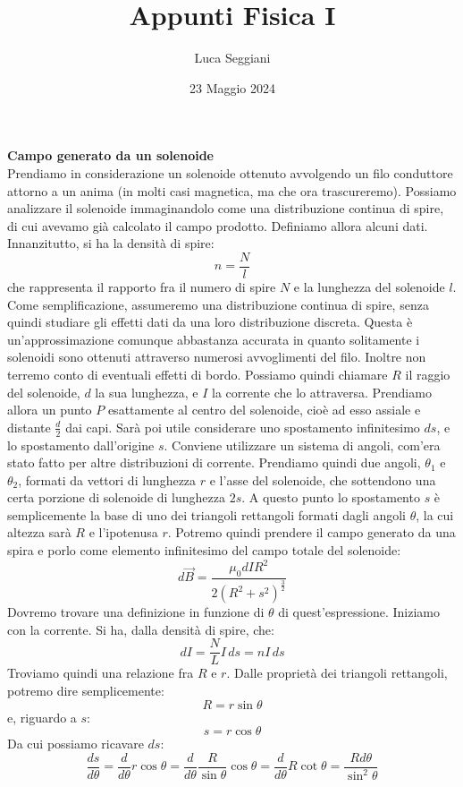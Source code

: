 \documentclass[a4paper,12pt]{article}
\title{Appunti Fisica I}
\author{Luca Seggiani}
\date{23 Maggio 2024}
\begin{document}
\maketitle
\textbf{Campo generato da un solenoide} \\
Prendiamo in considerazione un solenoide ottenuto avvolgendo un filo conduttore attorno a un anima (in molti casi magnetica, ma che ora trascureremo). Possiamo analizzare il solenoide immaginandolo come una distribuzione continua di spire,
di cui avevamo già calcolato il campo prodotto. Definiamo allora alcuni dati. Innanzitutto, si ha la densità di spire:
$$ n = \frac{N}{l} $$
che rappresenta il rapporto fra il numero di spire $N$ e la lunghezza del solenoide $l$. Come semplificazione, assumeremo una distribuzione continua di spire, senza quindi studiare gli effetti dati da una loro distribuzione discreta.
Questa è un'approssimazione comunque abbastanza accurata in quanto solitamente i solenoidi sono ottenuti attraverso numerosi avvoglimenti del filo. Inoltre non terremo conto di eventuali effetti di bordo.
Possiamo quindi chiamare $R$ il raggio del solenoide, $d$ la sua lunghezza, e $I$ la
corrente che lo attraversa. Prendiamo allora un punto $P$ esattamente al centro del solenoide, cioè ad esso assiale e distante $\frac{d}{2}$ dai capi. Sarà poi utile considerare uno spostamento infinitesimo $ds$, e lo spostamento dall'origine $s$.
Conviene utilizzare un sistema di angoli, com'era stato fatto per altre distribuzioni di corrente. Prendiamo quindi due angoli, $\theta_1$ e $\theta_2$, formati da vettori di lunghezza $r$ e l'asse del solenoide, che sottendono
una certa porzione di solenoide di lunghezza $2s$. A questo punto lo spostamento $s$ è semplicemente la base di uno dei triangoli rettangoli formati dagli angoli $\theta$, la cui altezza sarà $R$ e l'ipotenusa $r$. Potremo quindi prendere
il campo generato da una spira e porlo  come elemento infinitesimo del campo totale del solenoide:
$$ d\vec{B} = \frac{\mu_0 dI R^2}{2(R^2+s^2)^{\frac{3}{2}}} $$
Dovremo trovare una definizione in funzione di $\theta$ di quest'espressione. Iniziamo con la corrente. Si ha, dalla densità di spire, che:
$$ dI = \frac{N}{L}I\, ds= nI\,ds $$
Troviamo quindi una relazione fra $R$ e $r$. Dalle proprietà dei triangoli rettangoli, potremo dire semplicemente:
$$ R = r\sin{\theta} $$
e, riguardo a $s$:
$$ s = r\cos{\theta} $$
Da cui possiamo ricavare $ds$:
$$ \frac{ds}{d\theta} = \frac{d}{d\theta} r\cos{\theta} = \frac{d}{d\theta} \frac{R}{\sin{\theta}}{\cos{\theta} = \frac{d}{d\theta} R\cot{\theta}} = \frac{Rd{\theta}}{\sin^2{\theta}}$$
\end{document}
